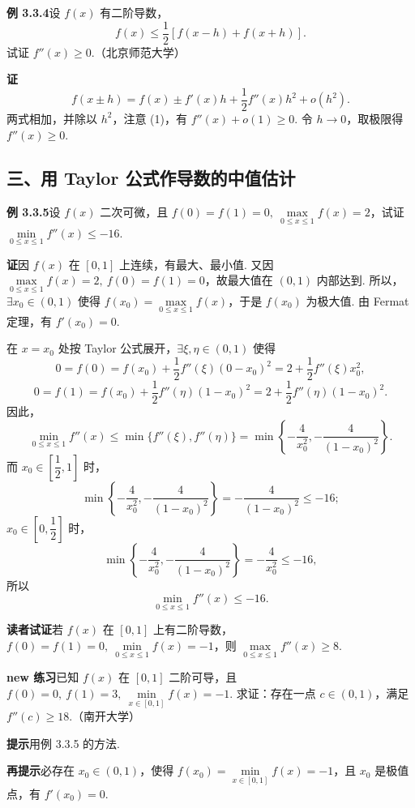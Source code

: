 \documentclass[UTF8,12pt,a4paper,fontset=fandol]{ctexart}
\begin{document}
\noindent\textbf{例 3.3.4}\quad 设 $f(x)$ 有二阶导数，
\begin{equation}
  f(x)\le\frac12[f(x-h)+f(x+h)].
\tag{1}
\end{equation}
试证 $f''(x)\ge0$.（北京师范大学）

\noindent\textbf{证}\quad
\[
  f(x\pm h)=f(x)\pm f'(x)h+\frac12f''(x)h^2+o(h^2).
\]
两式相加，并除以 $h^2$，注意 (1)，有 $f''(x)+o(1)\ge0$. 令 $h\to0$，取极限得 $f''(x)\ge0$.

\subsection*{三、用 Taylor 公式作导数的中值估计}

\noindent\textbf{例 3.3.5}\quad 设 $f(x)$ 二次可微，且 $f(0)=f(1)=0,\ \max\limits_{0\le x\le1}f(x)=2$，试证 $\min\limits_{0\le x\le1}f''(x)\le-16$.

\noindent\textbf{证}\quad 因 $f(x)$ 在 $[0,1]$ 上连续，有最大、最小值. 又因 $\max\limits_{0\le x\le1}f(x)=2,\ f(0)=f(1)=0$，故最大值在 $(0,1)$ 内部达到. 所以，$\exists x_0\in(0,1)$ 使得 $f(x_0)=\max\limits_{0\le x\le1}f(x)$，于是 $f(x_0)$ 为极大值. 由 Fermat 定理，有 $f'(x_0)=0$.

在 $x=x_0$ 处按 Taylor 公式展开，$\exists \xi,\eta\in(0,1)$ 使得
\[
  0=f(0)=f(x_0)+\frac12f''(\xi)(0-x_0)^2=2+\frac12f''(\xi)x_0^2,
\]
\[
  0=f(1)=f(x_0)+\frac12f''(\eta)(1-x_0)^2=2+\frac12f''(\eta)(1-x_0)^2.
\]
因此，
\[
  \min_{0\le x\le1}f''(x)
  \le
  \min\{f''(\xi),f''(\eta)\}
  =
  \min\left\{-\frac4{x_0^2},-\frac4{(1-x_0)^2}\right\}.
\]
而 $x_0\in\left[\dfrac12,1\right]$ 时，
\[
  \min\left\{-\frac4{x_0^2},-\frac4{(1-x_0)^2}\right\}
  =
  -\frac4{(1-x_0)^2}\le-16;
\]
$x_0\in\left[0,\dfrac12\right]$ 时，
\[
  \min\left\{-\frac4{x_0^2},-\frac4{(1-x_0)^2}\right\}
  =
  -\frac4{x_0^2}\le-16,
\]
所以
\[
  \min_{0\le x\le1}f''(x)\le-16.
\]

\noindent\textbf{读者试证}\quad 若 $f(x)$ 在 $[0,1]$ 上有二阶导数，$f(0)=f(1)=0,\ \min\limits_{0\le x\le1}f(x)=-1$，则 $\max\limits_{0\le x\le1}f''(x)\ge8$.

\noindent\textbf{new 练习}\quad 已知 $f(x)$ 在 $[0,1]$ 二阶可导，且 $f(0)=0,\ f(1)=3,\ \min\limits_{x\in[0,1]}f(x)=-1$. 求证：存在一点 $c\in(0,1)$，满足 $f''(c)\ge18$.（南开大学）

\noindent\textbf{提示}\quad 用例 3.3.5 的方法.

\noindent\textbf{再提示}\quad 必存在 $x_0\in(0,1)$，使得 $f(x_0)=\min\limits_{x\in[0,1]}f(x)=-1$，且 $x_0$ 是极值点，有 $f'(x_0)=0$.
\end{document}
